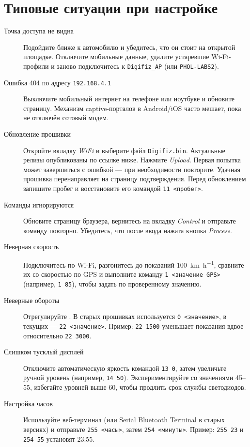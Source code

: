 \chapter{Типовые ситуации при настройке \ReplicaNextShort{}}\label{ch:replica-next-scenarios-ru}

\begin{description}
    \item[Точка доступа не видна] Подойдите ближе к автомобилю и убедитесь, что он стоит на открытой площадке. Отключите мобильные данные, удалите устаревшие Wi-Fi-профили и заново подключитесь к \texttt{Digifiz\_AP} (или \texttt{PHOL-LABS2}).
    \item[Ошибка 404 по адресу \texttt{192.168.4.1}] Выключите мобильный интернет на телефоне или ноутбуке и обновите страницу. Механизм captive-порталов в Android/iOS часто мешает, пока не отключён сотовый модем.
    \item[Обновление прошивки] Откройте вкладку \emph{WiFi} и выберите файл \texttt{Digifiz.bin}. Актуальные релизы опубликованы по ссылке ниже.
        Нажмите \emph{Upload}. Первая попытка может завершиться с ошибкой — при необходимости повторите. Удачная прошивка перенаправляет на страницу подтверждения. Перед обновлением запишите пробег и восстановите его командой \verb|11 <пробег>|.
    \item[Команды игнорируются] Обновите страницу браузера, вернитесь на вкладку \emph{Control} и отправьте команду повторно. Убедитесь, что после ввода нажата кнопка \emph{Process}.
    \item[Неверная скорость] Подключитесь по Wi-Fi, разгонитесь до показаний \SI{100}{\kilo\metre\per\hour}, сравните их со скоростью по GPS и выполните команду \verb|1 <значение GPS>| (например, \verb|1 85|), чтобы задать  по проверенному значению.
    \item[Неверные обороты] Отрегулируйте . В старых прошивках используется \verb|0 <значение>|, в текущих — \verb|22 <значение>|. Пример: \verb|22 1500| уменьшает показания вдвое относительно \verb|22 3000|.
    \item[Слишком тусклый дисплей] Отключите автоматическую яркость командой \verb|13 0|, затем увеличьте ручной уровень (например, \verb|14 50|). Экспериментируйте со значениями 45--55, избегайте уровней выше 60, чтобы продлить срок службы светодиодов.
    \item[Настройка часов] Используйте веб-терминал (или Serial Bluetooth Terminal в старых версиях) и отправьте \verb|255 <часы>|, затем \verb|254 <минуты>|. Пример: \verb|255 23| и \verb|254 55| установят 23:55.

\end{description}
